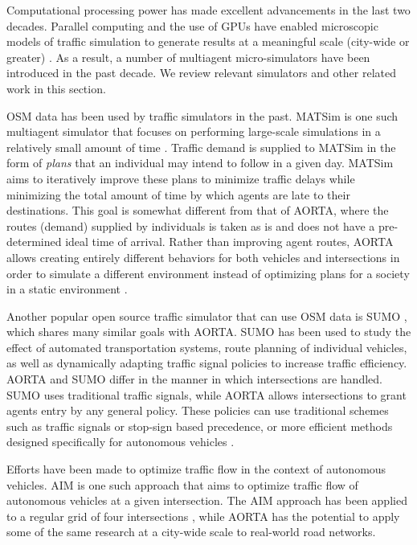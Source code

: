 \documentclass[letterpaper, 10 pt, conference]{ieeeconf}  %
\begin{document}

Computational processing power has made excellent advancements in the last two
decades. Parallel computing and the use of GPUs have enabled microscopic models
of traffic simulation to generate results at a meaningful scale (city-wide or
greater) \cite{nagel1994microscopic,shen2011agent}. As a result, a number of
multiagent micro-simulators have been introduced in the past decade. We review
relevant simulators and other related work in this section.

OSM data has been used by traffic simulators in the past. MATSim is one such
multiagent simulator that focuses on performing large-scale simulations in a
relatively small amount of time \cite{balmer2009matsim}. Traffic demand is
supplied to MATSim in the form of \textit{plans} that an individual may intend
to follow in a given day. MATSim aims to iteratively improve these plans to
minimize traffic delays while minimizing the total amount of time by which
agents are late to their destinations. This goal is somewhat different from
that of AORTA, where the routes (demand) supplied by individuals is taken as is
and does not have a pre-determined ideal time of arrival. Rather than improving
agent routes, AORTA allows creating entirely different behaviors for both
vehicles and intersections in order to simulate a different environment instead
of optimizing plans for a society in a static environment .

Another popular open source traffic simulator that can use OSM data is SUMO
\cite{SUMO2011}, which shares many similar goals with AORTA. SUMO has been used to
study the effect of automated transportation systems, route planning of
individual vehicles, as well as dynamically adapting traffic signal policies to
increase traffic efficiency.  AORTA and SUMO differ in the manner in which
intersections are handled. SUMO uses traditional traffic signals, while AORTA
allows intersections to grant agents entry by any general policy. These policies
can use traditional schemes such as traffic signals or stop-sign based
precedence, or more efficient methods designed specifically for autonomous
vehicles \cite{JAIR08-dresner}.

Efforts have been made to optimize traffic flow in the context of autonomous
vehicles. AIM \cite{JAIR08-dresner} is one such approach that aims to optimize
traffic flow of autonomous vehicles at a given intersection. The AIM approach
has been applied to a regular grid of four intersections
\cite{IROS11-hausknecht}, while AORTA has the potential to apply some of the
same research at a city-wide scale to real-world road networks.
\end{document}
